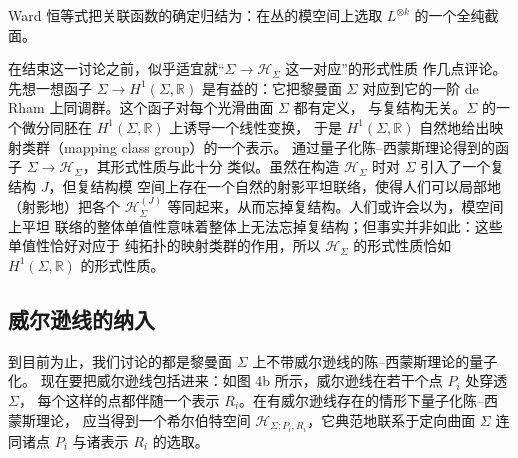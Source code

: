 \documentclass[11pt,a4paper]{article}
\begin{document}
Ward 恒等式把关联函数的确定归结为：在丛的模空间上选取 $L^{\otimes k}$ 的一个全纯截面。

在结束这一讨论之前，似乎适宜就“$\Sigma\to\mathcal{H}_\Sigma$ 这一对应”的形式性质
作几点评论。先想一想函子 $\Sigma\to H^1(\Sigma,\mathbb{R})$ 是有益的：它把黎曼面
$\Sigma$ 对应到它的一阶 de Rham 上同调群。这个函子对每个光滑曲面 $\Sigma$ 都有定义，
与复结构无关。$\Sigma$ 的一个微分同胚在 $H^1(\Sigma,\mathbb{R})$ 上诱导一个线性变换，
于是 $H^1(\Sigma,\mathbb{R})$ 自然地给出映射类群（mapping class group）的一个表示。
通过量子化陈–西蒙斯理论得到的函子 $\Sigma\to\mathcal{H}_\Sigma$，其形式性质与此十分
类似。虽然在构造 $\mathcal{H}_\Sigma$ 时对 $\Sigma$ 引入了一个复结构 $J$，但复结构模
空间上存在一个自然的射影平坦联络，使得人们可以局部地（射影地）把各个
$\mathcal{H}_\Sigma^{(J)}$ 等同起来，从而忘掉复结构。人们或许会以为，模空间上平坦
联络的整体单值性意味着整体上无法忘掉复结构；但事实并非如此：这些单值性恰好对应于
纯拓扑的映射类群的作用，所以 $\mathcal{H}_\Sigma$ 的形式性质恰如
$H^1(\Sigma,\mathbb{R})$ 的形式性质。



\subsection{威尔逊线的纳入}

到目前为止，我们讨论的都是黎曼面 $\Sigma$ 上不带威尔逊线的陈–西蒙斯理论的量子化。
现在要把威尔逊线包括进来：如图 4b 所示，威尔逊线在若干个点 $P_i$ 处穿透 $\Sigma$，
每个这样的点都伴随一个表示 $R_i$。在有威尔逊线存在的情形下量子化陈–西蒙斯理论，
应当得到一个希尔伯特空间 $\mathcal{H}_{\Sigma;P_i,R_i}$，它典范地联系于定向曲面
$\Sigma$ 连同诸点 $P_i$ 与诸表示 $R_i$ 的选取。
\end{document}
